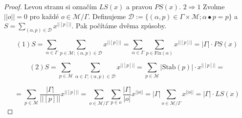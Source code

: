 \begin{proof}
	Levou stranu si označím $LS(x)$ a pravou $PS(x)$. $2 \Rightarrow 1$ Zvolme $||o|| = 0$ pro každé $o \in \mathcal{M}/\Gamma$. Definujeme $\mathcal{D} := \{(\alpha ,p) \in \Gamma \times \mathcal{M}; \alpha \bullet p = p\}$ a $S = \sum_{(\alpha, p) \in \mathcal{D}}x^{||[p]||}$. Pak počítáme dvěma způsoby.
	
	$$
	(1) S = \sum_{\alpha \in \Gamma} \sum_{p \in \mathcal{M}; (\alpha,p) \in \mathcal{D}} x^{||[p]||} = \sum_{\alpha \in \Gamma}\sum_{p \in \text{Fix}(\alpha)} x^{||[p]||} = |\Gamma| \cdot PS(x)
	$$
	
	$$
	(2) S = \sum_{p \in \mathcal{M}} \sum_{\alpha \in \Gamma; (\alpha, p) \in \mathcal{D}} x^{||[p]||} = \sum_{p \in \mathcal{M}} |\text{Stab}(p)| \cdot x^{||[p]||} =
	$$
	
	$$
	= \sum_{p \in \mathcal{M}} \frac{|\Gamma|}{||[p]||}x^{||[p]||} = \sum_{o \in \mathcal{M}/\Gamma}\sum_{p \in o} \frac{|\Gamma|}{|o|}x^{||o||} = |\Gamma| \sum_{o \in \mathcal{M}/\Gamma}x^{||o||} = |\Gamma| \cdot LS(x)
	$$
\end{proof}
